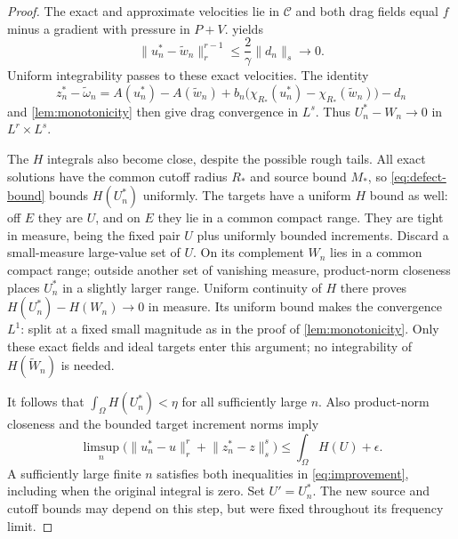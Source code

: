\documentclass[11pt]{article}
\theoremstyle{remark}
\newcommand{\norm}[2]{\lVert #1\rVert_{#2}}
\begin{document}
\begin{proof}
The exact and approximate velocities lie in $\mathcal C$ and both
drag fields equal $f$ minus a gradient with pressure in $P+V$.
 yields
\[
 \norm{u_n^*-\widetilde w_n}{r}^{r-1}
 \le\frac2\gamma\norm{d_n}{s}\longrightarrow0.
\]
Uniform integrability passes to these exact velocities. The identity
\[
 z_n^*-\widetilde\omega_n
 =A(u_n^*)-A(\widetilde w_n)
  +b_n\big(\chi_{R_*}(u_n^*)-\chi_{R_*}(\widetilde w_n)\big)-d_n
\]
and \cref{lem:monotonicity} then give drag convergence in $L^s$.
Thus $U_n^*-W_n\to0$ in $L^r\times L^s$.

The $H$ integrals also become close, despite the possible rough tails.
All exact solutions have the common cutoff radius $R_*$ and source
bound $M_*$, so \eqref{eq:defect-bound} bounds $H(U_n^*)$ uniformly.
The targets have a uniform $H$ bound as well: off $E$ they are $U$,
and on $E$ they lie in a common compact range. They are tight in
measure, being the fixed pair $U$ plus uniformly bounded increments.
Discard a small-measure large-value set of $U$. On its complement
$W_n$ lies in a common compact range; outside another set of vanishing
measure, product-norm closeness places $U_n^*$ in a slightly larger
range. Uniform continuity of $H$ there proves
$H(U_n^*)-H(W_n)\to0$ in measure. Its uniform bound makes the
convergence $L^1$: split at a fixed small magnitude as in the proof
of \cref{lem:monotonicity}.
Only these exact fields and ideal targets enter this argument; no
integrability of $H(\widetilde W_n)$ is needed.

It follows that $\int_\Omega H(U_n^*)<\eta$ for all sufficiently
large $n$. Also product-norm closeness and the bounded target increment
norms imply
\[
 \limsup_n\big(\norm{u_n^*-u}{r}^r+\norm{z_n^*-z}{s}^s\big)
 \le\int_\Omega H(U)+\epsilon.
\]
A sufficiently large finite $n$ satisfies both inequalities in
\eqref{eq:improvement}, including when the original integral is zero.
Set $U'=U_n^*$. The new source and cutoff bounds may depend on this
step, but were fixed throughout its frequency limit.
\end{proof}
\end{document}
